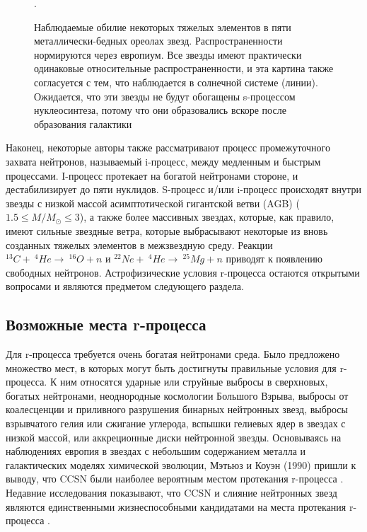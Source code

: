 \documentclass[14pt, a4paper]{article}
\numberwithin{figure}{section}
\numberwithin{equation}{section}
\begin{document}
\begin{figure}[ht]
	\caption{Наблюдаемые обилие некоторых тяжелых элементов в пяти металлически-бедных ореолах  звезд. Распространенности нормируются через европиум. Все звезды имеют практически одинаковые относительные распространенности, и эта картина также согласуется с тем, что наблюдается в солнечной системе (линии). Ожидается, что эти звезды не будут обогащены s-процессом нуклеосинтеза, потому что они образовались вскоре после образования галактики  \cite{new-abu}}.
	\label{ris:8}
\end{figure}

Наконец, некоторые авторы также рассматривают процесс промежуточного захвата нейтронов, называемый i-процесс, между медленным и быстрым процессами. I-процесс протекает на богатой нейтронами стороне, и дестабилизирует до пяти нуклидов. S-процесс и/или i-процесс происходят внутри звезды с низкой массой асимптотической гигантской ветви (AGB) ($1.5 \le M/M_\odot \le 3$), а также более массивных звездах, которые, как правило, имеют сильные звездные ветра, которые выбрасывают некоторые из вновь созданных тяжелых элементов в межзвездную среду. Реакции $^{13}C + \ ^4He \to \ ^{16}O + n$ и $^{22}Ne + \ ^4He \to \ ^{25}Mg + n$ приводят к появлению свободных нейтронов. Астрофизические условия r-процесса остаются открытыми вопросами и являются предметом следующего раздела.

\subsection{Возможные места r-процесса}

Для r-процесса требуется очень богатая нейтронами среда. Было предложено множество мест, в которых могут быть достигнуты правильные условия для r-процесса. К ним относятся ударные или струйные выбросы в сверхновых, богатых нейтронами, неоднородные космологии Большого Взрыва, выбросы от коалесценции и приливного разрушения бинарных нейтронных звезд, выбросы взрывчатого гелия или сжигание углерода, вспышки гелиевых ядер в звездах с низкой массой, или аккреционные диски нейтронной звезды. Основываясь на наблюдениях европия в звездах с небольшим содержанием металла и галактических моделях химической эволюции, Мэтьюз и Коуэн (1990) пришли к выводу, что CCSN были наиболее вероятным местом протекания r-процесса \cite{places}. Недавние исследования показывают, что CCSN и слияние нейтронных звезд являются единственными жизнеспособными кандидатами на места протекания r-процесса \cite{sites}.
\end{document}
